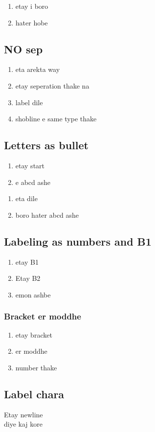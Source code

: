\documentclass{article}
\begin{document}
\begin{enumerate} [I]
    \item etay i boro 
    \item hater hobe  
\end{enumerate}

\subsection{NO sep}
\begin{enumerate} [nosep , label=*]
    \item eta arekta way
    \item etay seperation thake na
    \item label dile
    \item shobline e same type thake
\end{enumerate}

\subsection{Letters as bullet}
\begin{enumerate} [a]
    \item etay start 
    \item e abcd ashe
\end{enumerate}
\begin{enumerate} [A]
    \item eta dile
    \item boro hater abcd ashe
\end{enumerate}

\subsection{Labeling as numbers and B1}
\begin{enumerate} [label=B\arabic*]
    \item etay B1
    \item Etay B2
    \item emon ashbe
\end{enumerate}

\subsubsection{Bracket er moddhe}
\begin{enumerate} [label=(\arabic*)]
    \item etay bracket 
    \item er moddhe 
    \item number thake
\end{enumerate}

\subsection{Label chara}

 Etay newline \\
 diye kaj kore \\
\end{document}
